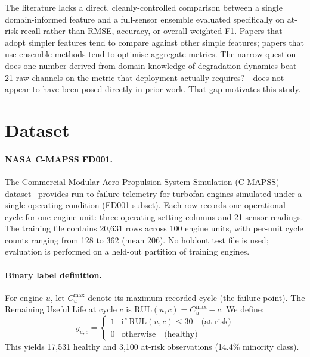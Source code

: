 \documentclass[10pt,twocolumn]{article}
\begin{document}
The literature lacks a direct, cleanly-controlled comparison between a single
domain-informed feature and a full-sensor ensemble evaluated specifically on at-risk
recall rather than RMSE, accuracy, or overall weighted F1.
Papers that adopt simpler features tend to compare against other simple features;
papers that use ensemble methods tend to optimise aggregate metrics.
The narrow question---does one number derived from domain knowledge of degradation
dynamics beat 21 raw channels on the metric that deployment actually requires?---does
not appear to have been posed directly in prior work.
That gap motivates this study.



\section{Dataset}
\label{sec:data}

\paragraph{NASA C-MAPSS FD001.}
The Commercial Modular Aero-Propulsion System Simulation (C-MAPSS)
dataset~\cite{saxena2008damage} provides run-to-failure telemetry for turbofan engines
simulated under a single operating condition (FD001 subset).
Each row records one operational cycle for one engine unit: three operating-setting
columns and 21 sensor readings.
The training file contains 20,631 rows across 100 engine units, with per-unit cycle
counts ranging from 128 to 362 (mean 206).
No holdout test file is used; evaluation is performed on a held-out partition of
training engines.

\paragraph{Binary label definition.}
For engine $u$, let $C_u^{\max}$ denote its maximum recorded cycle (the failure point).
The Remaining Useful Life at cycle $c$ is $\mathrm{RUL}(u,c)=C_u^{\max}-c$.
We define:
\begin{equation}
  y_{u,c}=
  \begin{cases}
    1 & \text{if }\mathrm{RUL}(u,c)\leq 30 \quad\text{(at risk)}\\
    0 & \text{otherwise}\quad\text{(healthy)}
  \end{cases}
\end{equation}
This yields 17,531 healthy and 3,100 at-risk observations (14.4\% minority class).
\end{document}
